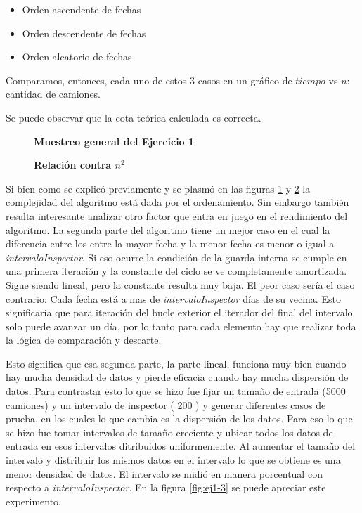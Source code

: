 \documentclass[11pt, a4paper, twoside]{article}
\begin{document}
\begin{itemize}
  \item Orden ascendente de fechas
  \item Orden descendente de fechas
  \item Orden aleatorio de fechas
\end{itemize}     

Comparamos, entonces, cada uno de estos $3$ casos en un gráfico de $tiempo$ vs $n$: cantidad de camiones. 

Se puede observar que la cota teórica calculada es correcta.

\clearpage
\begin{figure}[H]
   \begin{center}
   \caption{\textbf{Muestreo general del Ejercicio 1}}
   \label{fig:ej1-1}
   \end{center}
\end{figure}

\clearpage
\begin{figure}[H]
   \begin{center}
   \caption{\textbf{Relación contra $n^{2}$}}
   \label{fig:ej1-2}
   \end{center}
\end{figure}


Si bien como se explicó previamente y se plasmó en las figuras \ref{fig:ej1-1} y \ref{fig:ej1-2}
la complejidad del algoritmo está dada por el ordenamiento. Sin embargo también resulta interesante
analizar  otro factor que entra en juego en el rendimiento del algoritmo. La segunda parte
del algoritmo tiene un mejor caso en el cual la diferencia entre los entre la mayor fecha y la menor fecha
es menor o igual a \textit{intervaloInspector}. Si eso ocurre la condición de la guarda interna se cumple
en una primera iteración y la constante del ciclo se ve completamente amortizada. Sigue siendo lineal, pero
la constante resulta muy baja. El peor caso sería el caso contrario: Cada fecha está a mas de \textit{intervaloInspector}
días de su vecina. Esto significaría que para iteración del bucle exterior el iterador del final del intervalo 
solo puede avanzar un día, por lo tanto para cada elemento hay que realizar toda la lógica de comparación y descarte.

Esto significa que esa segunda parte, la parte lineal, funciona muy bien cuando hay mucha densidad de datos y pierde
eficacia cuando hay mucha dispersión de datos. Para contrastar esto lo que se hizo fue fijar un tamaño de entrada
(5000 camiones) y un intervalo de inspector ( 200 ) y generar diferentes casos de prueba, en los cuales lo que cambia
es la dispersión de los datos. Para eso lo que se hizo fue tomar intervalos de tamaño creciente y ubicar
todos los datos de entrada en esos intervalos ditribuidos uniformemente. Al aumentar el tamaño del intervalo
y distribuir los mismos datos en el intervalo lo que se obtiene es una menor densidad de datos. El intervalo
se midió en manera porcentual con respecto a \textit{intervaloInspector}. En la figura \ref{fig:ej1-3} se puede
apreciar este experimento.
\end{document}
